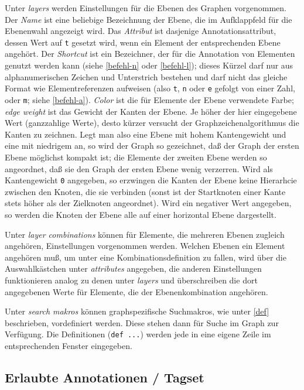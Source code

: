 \documentclass[12pt]{scrartcl}
\begin{document}
Unter \textit{layers} werden Einstellungen für die Ebenen des Graphen vorgenommen. Der \textit{Name} ist eine beliebige Bezeichnung der Ebene, die im Aufklappfeld für die Ebenenwahl angezeigt wird. Das \textit{Attribut} ist dasjenige Annotationsattribut, dessen Wert auf \texttt{t} gesetzt wird, wenn ein Element der entsprechenden Ebene angehört. Der \textit{Shortcut} ist ein Bezeichner, der für die Annotation von Elementen genutzt werden kann (siehe \ref{befehl-n} oder \ref{befehl-l}); dieses Kürzel darf nur aus alphanumerischen Zeichen und Unterstrich bestehen und darf nicht das gleiche Format wie Elementreferenzen aufweisen (also \texttt{t}, \texttt{n} oder \texttt{e} gefolgt von einer Zahl, oder  \texttt{m}; siehe \ref{befehl-a}). \textit{Color} ist die für Elemente der Ebene verwendete Farbe; \textit{edge weight} ist das Gewicht der Kanten der Ebene. Je höher der hier eingegebene Wert (ganzzahlige Werte), desto kürzer versucht der Graphzeichenalgorithmus die Kanten zu zeichnen. Legt man also eine Ebene mit hohem Kantengewicht und eine mit niedrigem an, so wird der Graph so gezeichnet, daß der Graph der ersten Ebene möglichst kompakt ist; die Elemente der zweiten Ebene werden so angeordnet, daß sie den Graph der ersten Ebene wenig verzerren. Wird als Kantengewicht \texttt{0} angegeben, so erzwingen die Kanten der Ebene keine Hierarhcie zwischen den Knoten, die sie verbinden (sonst ist der Startknoten einer Kante stets höher als der Zielknoten angeordnet). Wird ein negativer Wert angegeben, so werden die Knoten der Ebene alle auf einer horizontal Ebene dargestellt.

Unter \textit{layer combinations} können für Elemente, die mehreren Ebenen zugleich angehören, Einstellungen vorgenommen werden. Welchen Ebenen ein Element angehören muß, um unter eine Kombinationsdefinition zu fallen, wird über die Auswahlkästchen unter \textit{attributes} angegeben, die anderen Einstellungen funktionieren analog zu denen unter \textit{layers} und überschreiben die dort angegebenen Werte für Elemente, die der Ebenenkombination angehören.

Unter \textit{search makros} können graphspezifische Suchmakros, wie unter \ref{def} beschrieben, vordefiniert werden. Diese stehen dann für Suche im Graph zur Verfügung. Die Definitionen (\texttt{def ...}) werden jede in eine eigene Zeile im entsprechenden Fenster eingegeben.

\subsection{Erlaubte Annotationen / Tagset}\label{erlaubteannotationen}
\end{document}

